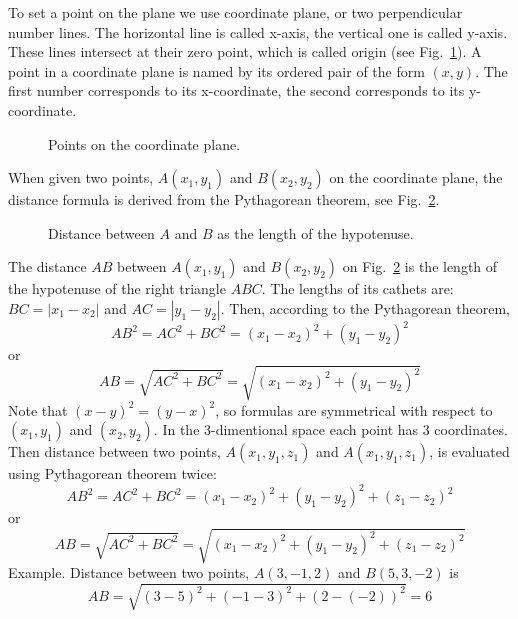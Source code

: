 \documentclass{article}
\begin{document}
To set a point on the plane we use coordinate plane, or two perpendicular number lines.
The horizontal line is called x-axis, the vertical one is called y-axis.
These lines intersect at their zero point, which is called origin (see Fig.~\ref{fig-2}).
A point in a coordinate plane is named by its ordered pair of the form $(x, y)$.
The first number corresponds to its x-coordinate, the second corresponds to its y-coordinate.
\begin{figure}
  \centering
  \def\svgwidth{\columnwidth}
  
\caption{Points on the coordinate plane.}
\label{fig-2}
\end{figure}
%
When given two points, $A(x_1, y_1)$ and $B(x_2, y_2)$ on the coordinate plane, the distance formula is derived from the Pythagorean theorem, see Fig.~\ref{fig-3}.
\begin{figure}
  \centering
  \def\svgwidth{\columnwidth}
  
\caption{Distance between $A$ and $B$ as the length of the hypotenuse.}
\label{fig-3}
\end{figure}
%
The distance $AB$ between $A(x_1, y_1)$ and $B(x_2, y_2)$ on Fig.~\ref{fig-3} is the length of the hypotenuse of the right triangle $ABC$.
The lengths of its cathets are: $BC = |x_1 - x_2|$ and $AC = |y_1 - y_2|$.
 Then, according to the Pythagorean theorem,
\begin{equation}
  AB^2 = AC^2 + BC^2 = (x_1 - x_2)^2 + (y_1 - y_2)^2
\end{equation}
or
\begin{equation}
  AB = \sqrt{AC^2 + BC^2} = \sqrt{(x_1 - x_2)^2 + (y_1 - y_2)^2}
\end{equation}
Note that $(x - y)^2 = (y - x)^2$, so formulas are symmetrical with respect to $(x_1, y_1)$ and $(x_2, y_2)$.
In the 3-dimentional space each point has 3 coordinates.
Then distance between two points, $A(x_1, y_1, z_1)$ and $A(x_1, y_1, z_1)$, is evaluated using Pythagorean theorem twice:
\begin{equation}
  AB^2 = AC^2 + BC^2 = (x_1 - x_2)^2 + (y_1 - y_2)^2 + (z_1 - z_2)^2
\end{equation}
or
\begin{equation}
  AB = \sqrt{AC^2 + BC^2} = \sqrt{(x_1 - x_2)^2 + (y_1 - y_2)^2 + (z_1 - z_2)^2}
\end{equation}
Example.
Distance between two points, $A(3, -1, 2)$ and $B(5, 3, -2)$ is
\begin{equation}
  AB = \sqrt{(3 - 5)^2 + (-1 - 3)^2 + (2 - (-2))^2} = 6
\end{equation}
\end{document}
